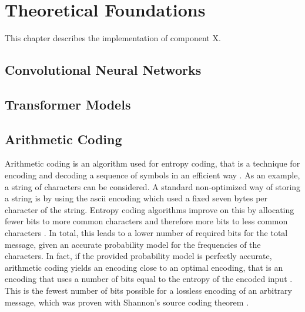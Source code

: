 \chapter{Theoretical Foundations\label{cha:chapter3}}

This chapter describes the implementation of component X.

\section{Convolutional Neural Networks}

\section{Transformer Models}

\section{Arithmetic Coding}
Arithmetic coding is an algorithm used for entropy coding, that is a technique for encoding and decoding a sequence of symbols in an efficient way \citep{witten_arithmetic_1987}. As an example, a string of characters can be considered. A standard non-optimized way of storing a string is by using the \ac{ascii} encoding which used a fixed seven bytes per character of the string. Entropy coding algorithms improve on this by allocating fewer bits to more common characters and therefore more bits to less common characters \citep{witten_arithmetic_1987}. In total, this leads to a lower number of required bits for the total message, given an accurate probability model for the frequencies of the characters. In fact, if the provided probability model is perfectly accurate, arithmetic coding yields an encoding close to an optimal encoding, that is an encoding that uses a number of bits equal to the entropy of the encoded input \citep{witten_arithmetic_1987}. This is the fewest number of bits possible for a lossless encoding of an arbitrary message, which was proven with Shannon's source coding theorem \citep{shannon_mathematical_1948}\citep{mackay_information_2003}.

